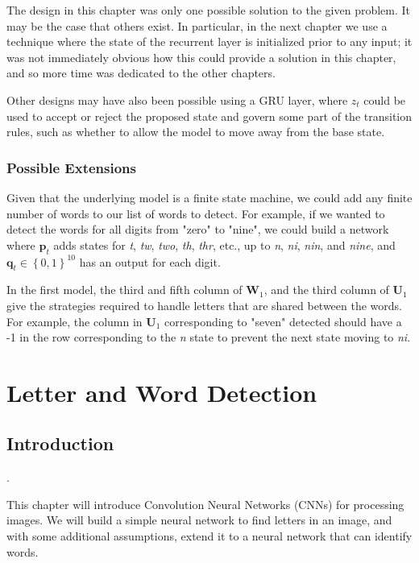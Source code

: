 \documentclass{somasmsc}
\begin{document}
The design in this chapter was only one possible solution to the given problem. It may be the case that others exist. In particular, in the next chapter we use a technique where the state of the recurrent layer is initialized prior to any input; it was not immediately obvious how this could provide a solution in this chapter, and so more time was dedicated to the other chapters.

Other designs may have also been possible using a GRU layer, where $z_t$ could be used to accept or reject the proposed state and govern some part of the transition rules, such as whether to allow the model to move away from the base state.

\subsection{Possible Extensions}

Given that the underlying model is a finite state machine, we could add any finite number of words to our list of words to detect. For example, if we wanted to detect the words for all digits from "zero" to "nine", we could build a network where $\pmb{p}_t$ adds states for \textit{t}, \textit{tw}, \textit{two}, \textit{th}, \textit{thr}, etc., up to \textit{n}, \textit{ni}, \textit{nin}, and \textit{nine}, and $\pmb{q}_t \in \left\{0,1\right\}^{10}$ has an output for each digit.

In the first model, the third and fifth column of $\mathbf{W}_1$, and the third column of $\mathbf{U}_1$ give the strategies required to handle letters that are shared between the words. For example, the column in $\mathbf{U}_1$ corresponding to "seven" detected should have a -1 in the row corresponding to the \textit{n} state to prevent the next state moving to \textit{ni}.





\chapter{Letter and Word Detection}

\section{Introduction}\label{letters:intro}.

This chapter will introduce Convolution Neural Networks (CNNs) for processing images. We will build a simple neural network to find letters in an image, and with some additional assumptions, extend it to a neural network that can identify words.
\end{document}
